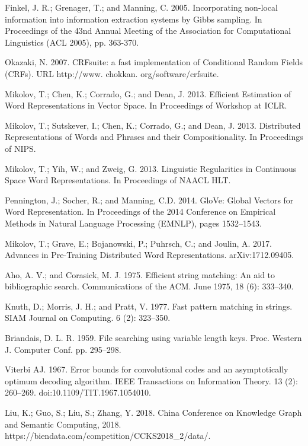 \documentclass[letterpaper]{article} %
\begin{document}
\smallskip \noindent
Finkel, J. R.; Grenager, T.; and Manning, C. 2005. Incorporating non-local information into information extraction systems by Gibbs sampling. In Proceedings of the 43nd Annual Meeting of the Association for Computational Linguistics (ACL 2005), pp. 363-370. 

\smallskip \noindent
Okazaki, N. 2007. CRFsuite: a fast implementation of Conditional Random Fields (CRFs). URL http://www. chokkan. org/software/crfsuite. 

\smallskip \noindent
Mikolov, T.; Chen, K.; Corrado, G.; and Dean, J. 2013. Efficient Estimation of Word Representations in Vector Space. In Proceedings of Workshop at ICLR. 

\smallskip \noindent
Mikolov, T.; Sutskever, I.; Chen, K.; Corrado, G.; and Dean, J. 2013. Distributed Representations of Words and Phrases and their Compositionality. In Proceedings of NIPS. 

\smallskip \noindent
Mikolov, T.; Yih, W.; and Zweig, G. 2013. Linguistic Regularities in Continuous Space Word Representations. In Proceedings of NAACL HLT. 

\smallskip \noindent
Pennington, J.; Socher, R.; and Manning, C.D. 2014. GloVe: Global Vectors for Word Representation. In Proceedings of the 2014 Conference on Empirical Methods in Natural Language Processing (EMNLP), pages 1532–1543. 

\smallskip \noindent
Mikolov, T.; Grave, E.; Bojanowski, P.; Puhrsch, C.; and Joulin, A. 2017. Advances in Pre-Training Distributed Word Representations. arXiv:1712.09405. 

\smallskip \noindent
Aho, A. V.; and Corasick, M. J. 1975. Efficient string matching: An aid to bibliographic search. Communications of the ACM. June 1975, 18 (6): 333–340.

\smallskip \noindent
Knuth, D.; Morris, J. H.; and Pratt, V. 1977. Fast pattern matching in strings. SIAM Journal on Computing. 6 (2): 323–350. 

\smallskip \noindent
Briandais, D. L. R. 1959. File searching using variable length keys. Proc. Western J. Computer Conf. pp. 295–298. 

\smallskip \noindent
Viterbi AJ. 1967. Error bounds for convolutional codes and an asymptotically optimum decoding algorithm. IEEE Transactions on Information Theory. 13 (2): 260–269. doi:10.1109/TIT.1967.1054010. 

\smallskip \noindent
Liu, K.; Guo, S.; Liu, S.; Zhang, Y. 2018. China Conference on Knowledge Graph and Semantic Computing, 2018. https://biendata.com/competition/CCKS2018\_2/data/. 
\end{document}
